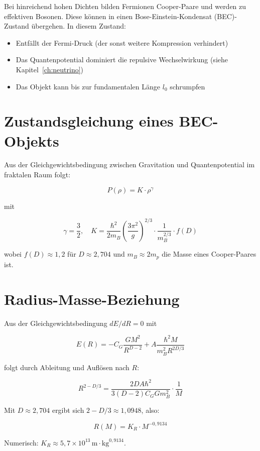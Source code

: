 Bei hinreichend hohen Dichten bilden Fermionen Cooper-Paare und werden zu effektiven Bosonen. Diese können in einen Bose-Einstein-Kondensat (BEC)-Zustand übergehen. In diesem Zustand:

\begin{itemize}
    \item Entfällt der Fermi-Druck (der sonst weitere Kompression verhindert)
    \item Das Quantenpotential dominiert die repulsive Wechselwirkung (siehe Kapitel~\ref{ch:neutrino})
    \item Das Objekt kann bis zur fundamentalen Länge \( l_0 \) schrumpfen
\end{itemize}

\section{Zustandsgleichung eines BEC-Objekts}
\label{sec:bec_zustandsgleichung}

Aus der Gleichgewichtsbedingung zwischen Gravitation und Quantenpotential im fraktalen Raum folgt:

\[
P(\rho) = K \cdot \rho^\gamma
\]

mit

\[
\gamma = \frac{3}{2}, \quad K = \frac{\hbar^2}{2m_B} \left( \frac{3\pi^2}{g} \right)^{2/3} \cdot \frac{1}{m_B^{2/3}} \cdot f(D)
\]

wobei \( f(D) \approx 1,2 \) für \( D \approx 2,704 \) und \( m_B \approx 2m_p \) die Masse eines Cooper-Paares ist.

\section{Radius-Masse-Beziehung}
\label{sec:bec_radius_masse}

Aus der Gleichgewichtsbedingung \( dE/dR = 0 \) mit

\[
E(R) = -C_G \frac{GM^2}{R^{D-2}} + A \frac{\hbar^2 M}{m_B^2 R^{2D/3}}
\]

folgt durch Ableitung und Auflösen nach \( R \):

\[
R^{2-D/3} = \frac{2DA\hbar^2}{3(D-2)C_G G m_B^2} \cdot \frac{1}{M}
\]

Mit \( D \approx 2,704 \) ergibt sich \( 2 - D/3 \approx 1,0948 \), also:

\[
R(M) = K_R \cdot M^{-0,9134}
\]

Numerisch: \( K_R \approx 5,7 \times 10^{13} \, \text{m} \cdot \text{kg}^{0,9134} \).

